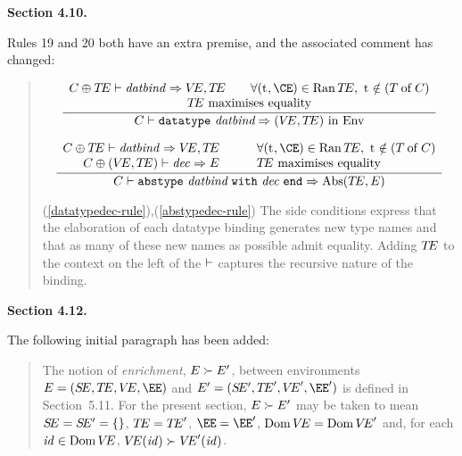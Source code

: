 {\samepage
\noindent
{\bf Section 4.10.}
\medskip

\noindent
Rules 19 and 20 both have an extra premise, and the associated comment has
changed:
\setcounter{equation}{18}

}
\begin{quotation}
\begin{equation}        %
\label{datatypedec-rule}
\frac{\begin{array}{c}
\C\oplus\TE\ts\datbind\ra\VE,\TE\qquad
      \forall(\t,\CE)\in\Ran\TE,\ \t\notin(\of{\T}{\C}) \\
     \mbox{$\TE$ maximises equality}
     \end{array}
     }
     {\C\ts\datatypedec\ra(\VE,\TE)\ \In\ \Env}
\end{equation}

\begin{equation}        %
\label{abstypedec-rule}
\frac{\begin{array}{rl}
      \C\oplus\TE\ts\datbind\ra\VE,\TE\qquad &
      \forall(\t,\CE)\in\Ran\TE,\ \t\notin(\of{\T}{\C})\\
      \C\oplus(\VE,\TE)\ts\dec\ra\E\qquad &
     \mbox{$\TE$ maximises equality}
      \end{array}
     }
     {\C\ts\abstypedec\ra\Abs(\TE,\E)}
\end{equation}

\begin{description}
\item{(\ref{datatypedec-rule}),(\ref{abstypedec-rule})}
The side conditions
express that the elaboration of each datatype binding
generates new type names and that as many of these new names
as possible admit equality.  Adding $\mbox{$T\!E$}$ to the context on the left
of the $\vdash$ captures the recursive nature of the binding.
\end{description}
\end{quotation}


{\samepage
\noindent
{\bf Section 4.12.}
\medskip

\noindent
The following initial paragraph has been added:

}
\begin{quotation}
\noindent
The notion of {\sl enrichment}, $E\succ E'$, between environments
$\E=(\SE,\TE,\VE,\EE)$ and $\E'=(\SE',\TE',\VE',\EE')$ is defined
in Section~5.11. For the present section,  $E\succ E'$
may be taken to mean $S\!E=S\!E'=\{\}$, $\mbox{$T\!E$}=\mbox{$T\!E$}'$,
$\EE=\EE'$, $\mathop{\rm Dom}\nolimits\mbox{$V\!E$}=\mathop{\rm Dom}\nolimits\mbox{$V\!E$}'$ and, for each ${\it id}\in\mathop{\rm Dom}\nolimits\mbox{$V\!E$}$,
$\mbox{$V\!E$}({\it id})\succ\mbox{$V\!E$}'({\it id})$.
\end{quotation}
\bigskip

